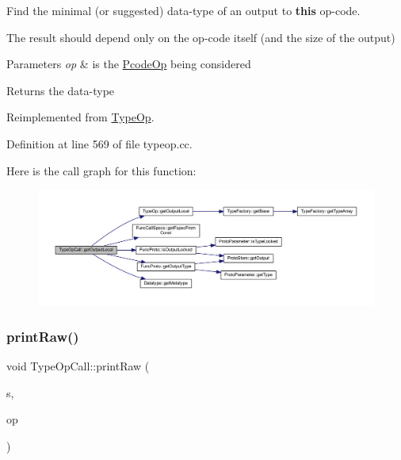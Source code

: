 Find the minimal (or suggested) data-\/type of an output to {\bfseries{this}} op-\/code. 

The result should depend only on the op-\/code itself (and the size of the output) 
\begin{DoxyParams}{Parameters}
{\em op} & is the \mbox{\hyperlink{class_pcode_op}{Pcode\+Op}} being considered \\
\hline
\end{DoxyParams}
\begin{DoxyReturn}{Returns}
the data-\/type 
\end{DoxyReturn}


Reimplemented from \mbox{\hyperlink{class_type_op_a3454cadfb15f6794829123a7ecfe38f5}{Type\+Op}}.



Definition at line 569 of file typeop.\+cc.

Here is the call graph for this function\+:
\nopagebreak
\begin{figure}[H]
\begin{center}
\leavevmode
\includegraphics[width=350pt]{class_type_op_call_a0900277daf94a76b57d96ba468514815_cgraph}
\end{center}
\end{figure}
\mbox{\label{class_type_op_call_ace006a5428b39501951783846770f227}} 
\subsubsection{\texorpdfstring{printRaw()}{printRaw()}}
{\footnotesize\ttfamily void Type\+Op\+Call\+::print\+Raw (\begin{DoxyParamCaption}\item[{ostream \&}]{s,  }\item[{const \mbox{\hyperlink{class_pcode_op}{Pcode\+Op}} $\ast$}]{op }\end{DoxyParamCaption})\hspace{0.3cm}{\ttfamily [virtual]}}



